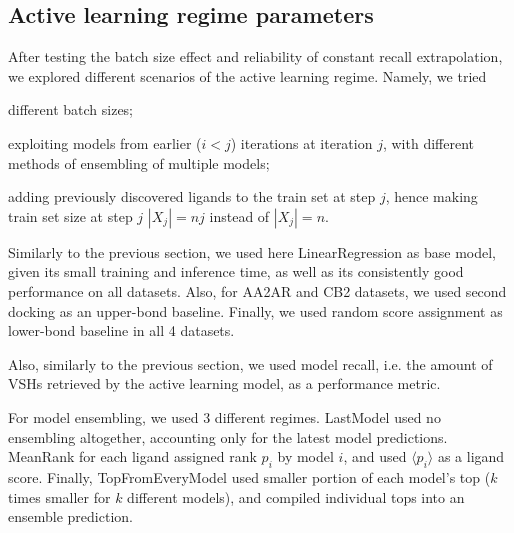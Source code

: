 \subsection{Active learning regime parameters}

After testing the batch size effect and reliability of constant recall extrapolation, we explored different scenarios of the active learning regime. Namely, we tried
\begin{enumerate*}[label=(\roman*)]
    \item different batch sizes;
    \item exploiting models from earlier ($i < j$) iterations at iteration $j$, with different methods of ensembling of multiple models;
    \item adding previously discovered ligands to the train set at step $j$, hence making train set size at step $j$ $|X_j| = nj$ instead of $|X_j|=n$.    
\end{enumerate*}

Similarly to the previous section, we used here LinearRegression as base model, given its small training and inference time, as well as its consistently good performance on all datasets. Also, for AA2AR and CB2 datasets, we used second docking as an upper-bond baseline. Finally, we used random score assignment as lower-bond baseline in all 4 datasets. 

Also, similarly to the previous section, we used model recall, i.e. the amount of VSHs retrieved by the active learning model, as a performance metric.

For model ensembling, we used 3 different regimes. LastModel used no ensembling altogether, accounting only for the latest model predictions. MeanRank for each ligand assigned rank $p_i$ by model $i$, and used $\langle p_i \rangle$ as a ligand score. Finally, TopFromEveryModel used smaller portion of each model's top ($k$ times smaller for $k$ different models), and compiled individual tops into an ensemble prediction.





